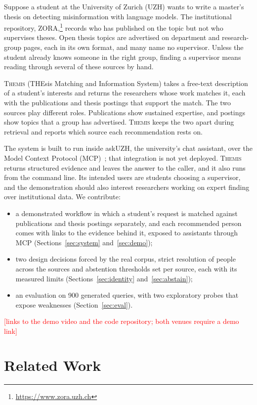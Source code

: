 \documentclass[sigconf,nonacm]{acmart}
\newcommand{\TODO}[1]{\textcolor{red}{[#1]}}
\newcommand{\sys}{\textsc{Themis}}
\begin{document}
Suppose a student at the University of Zurich (UZH) wants to write a master's thesis on detecting misinformation with language models. The institutional repository, ZORA,\footnote{\url{https://www.zora.uzh.ch}} records who has published on the topic but not who supervises theses. Open thesis topics are advertised on department and research-group pages, each in its own format, and many name no supervisor. Unless the student already knows someone in the right group, finding a supervisor means reading through several of these sources by hand.

\sys{} (THEsis Matching and Information System) takes a free-text description of a student's interests and returns the researchers whose work matches it, each with the publications and thesis postings that support the match. The two sources play different roles. Publications show sustained expertise, and postings show topics that a group has advertised. \sys{} keeps the two apart during retrieval and reports which source each recommendation rests on.

The system is built to run inside askUZH, the university's chat assistant, over the Model Context Protocol (MCP)~\cite{mcp}; that integration is not yet deployed. \sys{} returns structured evidence and leaves the answer to the caller, and it also runs from the command line. Its intended users are students choosing a supervisor, and the demonstration should also interest researchers working on expert finding over institutional data. We contribute:
\begin{itemize}
\item a demonstrated workflow in which a student's request is matched against publications and thesis postings separately, and each recommended person comes with links to the evidence behind it, exposed to assistants through MCP (Sections~\ref{sec:system} and~\ref{sec:demo});
\item two design decisions forced by the real corpus, strict resolution of people across the sources and abstention thresholds set per source, each with its measured limits (Sections~\ref{sec:identity} and~\ref{sec:abstain});
\item an evaluation on 900 generated queries, with two exploratory probes that expose weaknesses (Section~\ref{sec:eval}).
\end{itemize}
\TODO{links to the demo video and the code repository; both venues require a demo link}

\section{Related Work}
\end{document}
